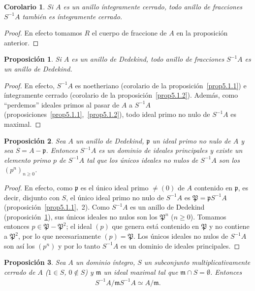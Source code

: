 \documentclass[oneside,bibtotoc,leqno,spanish]{amsbook}
\newcommand{\idl}[1]{\mathfrak{#1}}
\numberwithin{equation}{section}
\theoremstyle{defi}
\theoremstyle{note}
\newtheorem{proposition}{Proposici\'on}
\newtheorem*{corollary*}{Corolario}
\theoremstyle{rem}
\numberwithin{theorem}{section}
\numberwithin{proposition}{section}
\numberwithin{definition}{section}
\numberwithin{lemma}{section}
\numberwithin{corollary}{section}
\numberwithin{example}{section}
\numberwithin{footnote}{section}%
\begin{document}
\begin{corollary*}
Si $A$ es un anillo \'integramente cerrado, todo anillo de fracciones $S^{-1}A$ tambi\'en es \'integramente
cerrado.
\end{corollary*}

\begin{proof}
En efecto tomamos $R$ el cuerpo de fraccione de $A$ en la proposici\'on anterior.
\end{proof}

\begin{proposition}\label{prop5.1.3}
Si $A$ es un anillo de Dedekind, todo anillo de fracciones $S^{-1}A$ es un anillo de Dedekind.
\end{proposition}

\begin{proof}
En efecto, $S^{-1}A$ es noetheriano (corolario de la proposici\'on~\ref{prop5.1.1})
e \'integramente cerrado (corolario de la proposici\'on~\ref{prop5.1.2}). Adem\'as,
como ``perdemos'' ideales primos al pasar de $A$ a $S^{-1}A$ (proposiciones~\ref{prop5.1.1},~\ref{prop5.1.2}), todo ideal primo no nulo de $S^{-1}A$
es maximal.
\end{proof}

\begin{proposition}\label{prop5.1.4}
Sea $A$ un anillo de Dedekind, $\idl{p}$ un ideal primo no nulo de $A$ y sea $S = A-\idl{p}$. Entonces $S^{-1}A$
es un dominio de ideales principales y existe un elemento primo $p$ de $S^{-1}A$ tal que los \'unicos
ideales no nulos de $S^{-1}A$ son los $(p^{n})_{n\geq 0}$.
\end{proposition}

\begin{proof}
En efecto, como $\idl{p}$ es el \'unico ideal primo $\neq(0)$ de $A$ contenido en $\idl{p}$, es decir, disjunto con
$S$, el \'unico ideal primo no nulo de $S^{-1}A$ es $\idl{P}=\idl{p}S^{-1}A$
(proposici\'on~\ref{prop5.1.1},~2). Como $S^{-1}A$ es un
anillo de Dedekind (proposici\'on~\ref{prop5.1.3}), sus \'unicos ideales no nulos son los $\idl{P}^{n}$ ($n\geq 0$). Tomamos entonces
$p\in\idl{P}-\idl{P}^{2}$; el ideal $(p)$ que genera est\'a contenido en $\idl{P}$ y no contiene a $\idl{P}^{2}$,
por lo que necesariamente $(p) = \idl{P}$. Los \'unicos ideales no nulos de $S^{-1}A$ son as\'i los $(p^{n})$
y por lo tanto $S^{-1}A$ es un dominio de ideales principales.
\end{proof}

\begin{proposition}\label{prop5.1.5}
Sea $A$ un dominio \'integro, $S$ un subconjunto multiplicativamente cerrado de $A$
{\upshape(}$1\in S$, $0\notin S${\upshape)} y $\idl{m}$ un ideal maximal tal que
$\idl{m}\cap S = \emptyset$. Entonces
\begin{gather*}
S^{-1}A/\idl{m}S^{-1}A\simeq A/\idl{m}.
\end{gather*}
\end{proposition}
\end{document}
